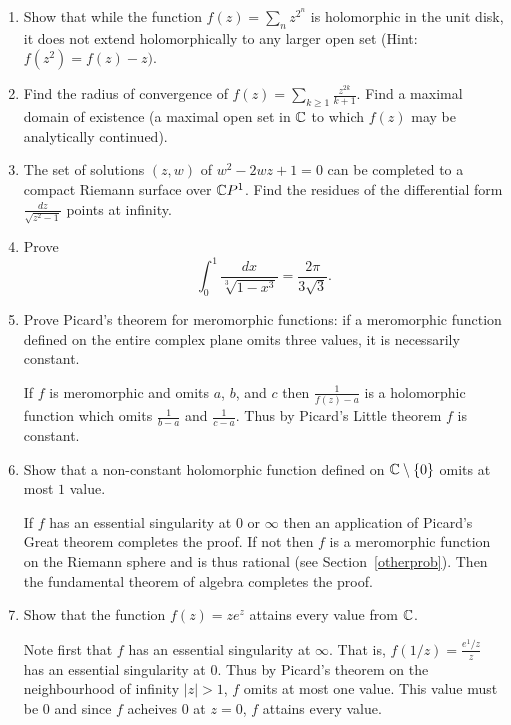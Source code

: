 \documentclass[letterpaper, 12pt]{article}
\begin{document}
\begin{enumerate}
    \item
    Show that while the function \(f(z) = \sum_n z^{2^n}\) is holomorphic in the unit disk, it does not extend holomorphically to any larger open set (Hint: \(f(z^2) = f(z) - z)\).

    \item
    Find the radius of convergence of \(f(z) = \sum_{k\geq 1} \frac{z^{2k}}{k+1}\). Find a maximal domain of existence (a maximal open set in \(\mathbb{C}\) to which \(f(z)\) may be analytically continued).

    \item
    The set of solutions \((z,w)\) of \(w^2 - 2wz + 1 = 0\) can be completed to a compact Riemann surface over \(\mathbb{C} P^1\). Find the residues of the differential form \(\frac{dz}{\sqrt{z^2-1}}\) points at infinity.
    
    \item
    Prove
    \[ \int_0^1 \frac{dx}{\sqrt[3]{1-x^3}} = \frac{2\pi}{3 \sqrt{3}}.\]

    \item
    Prove Picard's theorem for meromorphic functions: if a meromorphic function defined on the entire complex plane omits three values, it is necessarily constant.

    \begin{solution}
        If \(f\) is meromorphic and omits \(a\), \(b\), and \(c\) then \(\frac{1}{f(z)-a}\) is a holomorphic function which omits \(\frac{1}{b-a}\) and \(\frac{1}{c-a}\). Thus by Picard's Little theorem \(f\) is constant.
    \end{solution}

    \item
    Show that a non-constant holomorphic function defined on \(\mathbb{C}\setminus\{0\}\) omits at most \(1\) value.
    \begin{solution}
        If \(f\) has an essential singularity at \(0\) or \(\infty\) then an application of Picard's Great theorem completes the proof. If not then \(f\) is a meromorphic function on the Riemann sphere and is thus rational (see Section~\ref{otherprob}). Then the fundamental theorem of algebra completes the proof. 
    \end{solution}

    \item
    Show that the function \(f(z) = ze^z\) attains every value from \(\mathbb{C}\).
    \begin{solution}
        Note first that \(f\) has an essential singularity at \(\infty\). That is, \(f(1/z) = \frac{e^1/z}{z}\) has an essential singularity at \(0\). Thus by Picard's theorem on the neighbourhood of infinity \(|z| > 1\), \(f\) omits at most one value. This value must be \(0\) and since \(f\) acheives \(0\) at \(z=0\), \(f\) attains every value.
    \end{solution}



\end{enumerate}
\end{document}
